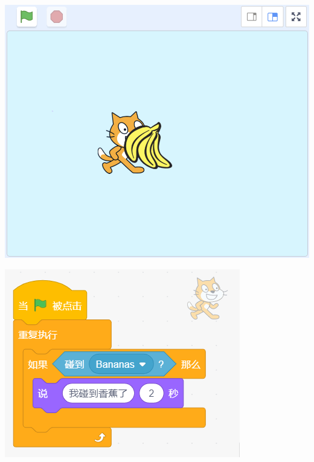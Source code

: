\documentclass[10pt, a4paper]{article}
\begin{document}
\begin{enumerate}
        \begin{minipage}[t]{.21\textwidth}
            \centering
            \includegraphics[width=\textwidth]{figure/12-1.png}
        \end{minipage}
        \begin{minipage}[t]{.22\textwidth}
            \centering
            \includegraphics[width=\textwidth]{figure/12-2.png}
        \end{minipage}
        \begin{minipage}[t]{.26\textwidth}
            \centering

\end{minipage}
\end{enumerate}
\end{document}
